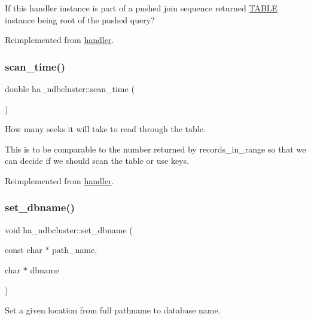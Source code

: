 If this handler instance is part of a pushed join sequence returned \mbox{\hyperlink{structTABLE}{T\+A\+B\+LE}} instance being root of the pushed query? 

Reimplemented from \mbox{\hyperlink{classhandler_a624f6946109f48559e92a9e7c1b86517}{handler}}.

\mbox{\label{classha__ndbcluster_a21574780af8b6cdc0bbcf8dc5ccb5164}} 
\subsubsection{\texorpdfstring{scan\+\_\+time()}{scan\_time()}}
{\footnotesize\ttfamily double ha\+\_\+ndbcluster\+::scan\+\_\+time (\begin{DoxyParamCaption}{ }\end{DoxyParamCaption})\hspace{0.3cm}{\ttfamily [virtual]}}

How many seeks it will take to read through the table.

This is to be comparable to the number returned by records\+\_\+in\+\_\+range so that we can decide if we should scan the table or use keys. 

Reimplemented from \mbox{\hyperlink{classhandler_a65f8e5188e2bd9636a564bbc0c3fef86}{handler}}.

\mbox{\label{classha__ndbcluster_a1a9f8c543b010643808df803f7db9e1b}} 
\subsubsection{\texorpdfstring{set\+\_\+dbname()}{set\_dbname()}}
{\footnotesize\ttfamily void ha\+\_\+ndbcluster\+::set\+\_\+dbname (\begin{DoxyParamCaption}\item[{const char $\ast$}]{path\+\_\+name,  }\item[{char $\ast$}]{dbname }\end{DoxyParamCaption})\hspace{0.3cm}{\ttfamily [static]}}

Set a given location from full pathname to database name. \mbox{\label{classha__ndbcluster_a3432f398baec4d4ebc0b02af534bd860}} 
